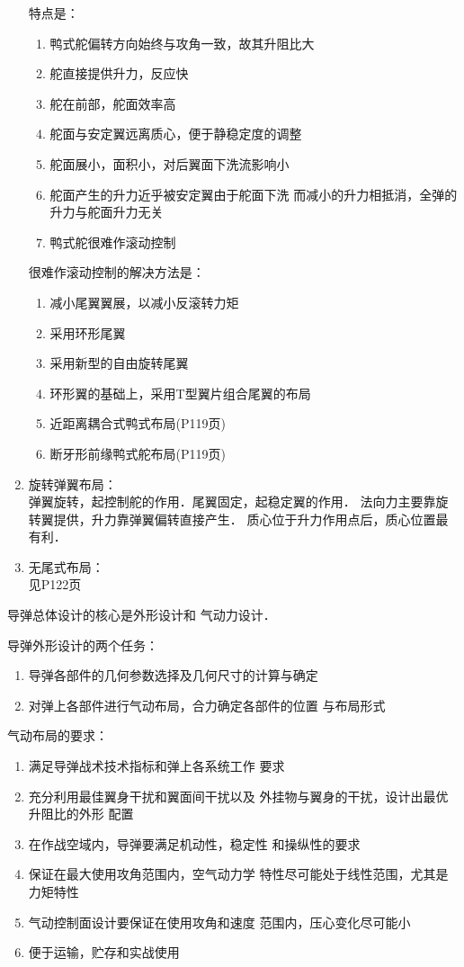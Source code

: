 \begin{notice}
\begin{enumerate}
    特点是：
    \begin{enumerate}
      \item 鸭式舵偏转方向始终与攻角一致，故其升阻比大
      \item 舵直接提供升力，反应快
      \item 舵在前部，舵面效率高
      \item 舵面与安定翼远离质心，便于静稳定度的调整
      \item 舵面展小，面积小，对后翼面下洗流影响小
      \item 舵面产生的升力近乎被安定翼由于舵面下洗
        而减小的升力相抵消，全弹的升力与舵面升力无关
      \item 鸭式舵{\color{red}很难作滚动控制}
    \end{enumerate}
    很难作滚动控制的解决方法是：
    \begin{enumerate}
      \item 减小尾翼翼展，以减小反滚转力矩
      \item 采用环形尾翼
      \item 采用新型的自由旋转尾翼
      \item 环形翼的基础上，采用T型翼片组合尾翼的布局
      \item 近距离耦合式鸭式布局(P119页)
      \item 断牙形前缘鸭式舵布局(P119页)
    \end{enumerate}
  \item 旋转弹翼布局：\\ 
    弹翼旋转，起控制舵的作用．尾翼固定，起稳定翼的作用．
    法向力主要靠旋转翼提供，升力靠弹翼偏转直接产生．
    质心位于升力作用点后，质心位置最有利．
  \item 无尾式布局：\\ 
    见P122页
\end{enumerate}
\end{notice}

导弹总体设计的核心是{\color{blue}外形设计和
气动力设计}．

导弹外形设计的两个任务：
\begin{enumerate}
  \item 导弹各部件的几何参数选择及几何尺寸的计算与确定
  \item 对弹上各部件进行气动布局，合力确定各部件的位置
    与布局形式
\end{enumerate}

气动布局的要求：
\begin{enumerate}
  \item 满足导弹战术技术指标和弹上各系统工作
    要求
  \item 充分利用最佳翼身干扰和翼面间干扰以及
    外挂物与翼身的干扰，设计出最优升阻比的外形
    配置
  \item 在作战空域内，导弹要满足机动性，稳定性
    和操纵性的要求
  \item 保证在最大使用攻角范围内，空气动力学
    特性尽可能处于线性范围，尤其是力矩特性
  \item 气动控制面设计要保证在使用攻角和速度
    范围内，压心变化尽可能小
  \item 便于运输，贮存和实战使用
\end{enumerate}

